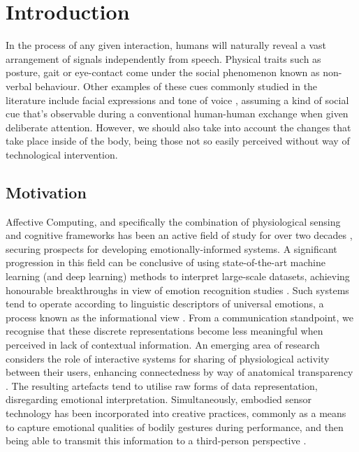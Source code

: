 

\chapter{Introduction}
\label{sec:objectives}

In the process of any given interaction, humans will naturally reveal a vast arrangement of signals independently from speech. Physical traits such as posture, gait or eye-contact come under the social phenomenon known as non-verbal behaviour. Other examples of these cues commonly studied in the literature include facial expressions and tone of voice \cite{chanel_connecting_2015,carton_nonverbal_1999}, assuming a kind of social cue that's observable during a conventional human-human exchange when given deliberate attention. However, we should also take into account the changes that take place inside of the body, being those not so easily perceived without way of technological intervention.

\section{Motivation}
\label{intro:matoivation}

Affective Computing, and specifically the combination of physiological sensing and cognitive frameworks has been an active field of study for over two decades \cite{picard_affective_2000}, securing prospects for developing emotionally-informed systems. A significant progression in this field can be conclusive of using state-of-the-art machine learning (and deep learning) methods to interpret large-scale datasets, achieving honourable breakthroughs in view of emotion recognition studies \cite{bota_review_2019}. Such systems tend to operate according to linguistic descriptors of universal emotions, a process known as the informational view \cite{boehner_how_2007}. From a communication standpoint, we recognise that these discrete representations become less meaningful when perceived in lack of contextual information. An emerging area of research considers the role of interactive systems for sharing of physiological activity between their users, enhancing connectedness by way of anatomical transparency \cite{lux_live_2018}. The resulting artefacts tend to utilise raw forms of data representation, disregarding emotional interpretation. Simultaneously, embodied sensor technology has been incorporated into creative practices, commonly as a means to capture emotional qualities of bodily gestures during performance, and then being able to transmit this information to a third-person perspective \cite{fdili_alaoui_seeing_2017}. 


